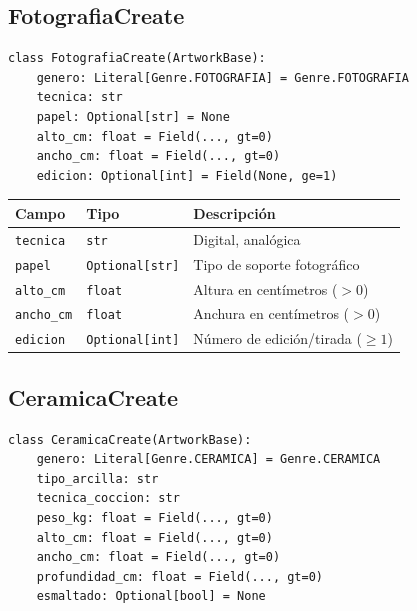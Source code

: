 \documentclass[12pt,a4paper]{article}
\begin{document}
\subsection{FotografiaCreate}

\begin{lstlisting}
class FotografiaCreate(ArtworkBase):
    genero: Literal[Genre.FOTOGRAFIA] = Genre.FOTOGRAFIA
    tecnica: str
    papel: Optional[str] = None
    alto_cm: float = Field(..., gt=0)
    ancho_cm: float = Field(..., gt=0)
    edicion: Optional[int] = Field(None, ge=1)
\end{lstlisting}

\begin{center}
\begin{tabular}{lll}
\toprule
\textbf{Campo} & \textbf{Tipo} & \textbf{Descripción} \\
\midrule
\texttt{tecnica} & \texttt{str} & Digital, analógica \\
\texttt{papel} & \texttt{Optional[str]} & Tipo de soporte fotográfico \\
\texttt{alto\_cm} & \texttt{float} & Altura en centímetros ($>0$) \\
\texttt{ancho\_cm} & \texttt{float} & Anchura en centímetros ($>0$) \\
\texttt{edicion} & \texttt{Optional[int]} & Número de edición/tirada ($\ge 1$) \\
\bottomrule
\end{tabular}
\end{center}

\subsection{CeramicaCreate}

\begin{lstlisting}
class CeramicaCreate(ArtworkBase):
    genero: Literal[Genre.CERAMICA] = Genre.CERAMICA
    tipo_arcilla: str
    tecnica_coccion: str
    peso_kg: float = Field(..., gt=0)
    alto_cm: float = Field(..., gt=0)
    ancho_cm: float = Field(..., gt=0)
    profundidad_cm: float = Field(..., gt=0)
    esmaltado: Optional[bool] = None
\end{lstlisting}
\end{document}
